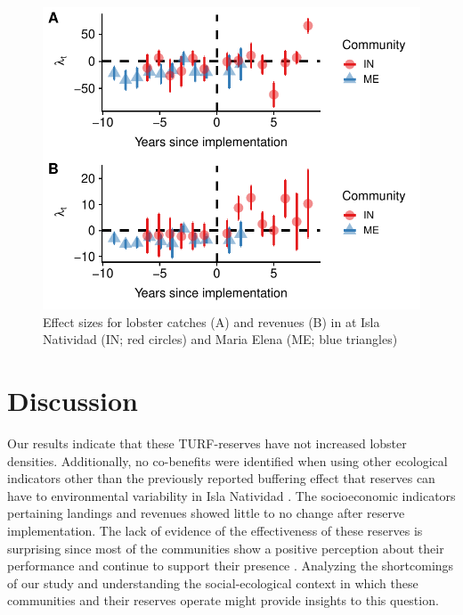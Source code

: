 \documentclass{frontiersSCNS}
\begin{document}
\begin{figure}
\centering
\includegraphics{Villasenor-Derbez_files/figure-latex/unnamed-chunk-6-1.pdf}
\caption{\label{fig:unnamed-chunk-6}\label{fig:lobsters}Effect sizes for
lobster catches (A) and revenues (B) in at Isla Natividad (IN; red
circles) and Maria Elena (ME; blue triangles)}
\end{figure}

\clearpage

\section{Discussion}\label{discussion}

Our results indicate that these TURF-reserves have not increased lobster
densities. Additionally, no co-benefits were identified when using other
ecological indicators other than the previously reported buffering
effect that reserves can have to environmental variability in Isla
Natividad \citep{micheli_2012-EU}. The socioeconomic indicators
pertaining landings and revenues showed little to no change after
reserve implementation. The lack of evidence of the effectiveness of
these reserves is surprising since most of the communities show a
positive perception about their performance and continue to support
their presence \citep{ayer_2018}. Analyzing the shortcomings of our
study and understanding the social-ecological context in which these
communities and their reserves operate might provide insights to this
question.
\end{document}
